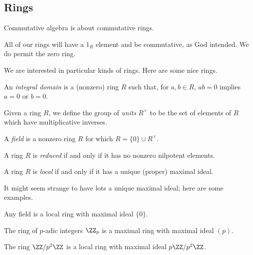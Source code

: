 \subsection{Rings}
Commutative algebra is about commutative rings.
\begin{warn}
	All of our rings will have a $1_R$ element and be commutative, as God intended. We do permit the zero ring.
\end{warn}
We are interested in particular kinds of rings. Here are some nice rings.
\begin{definition}
	An \textit{integral domain} is a (nonzero) ring $R$ such that, for $a,b\in R$, $ab=0$ implies $a=0$ or $b=0$.
\end{definition}
\begin{definition}[Units]
	Given a ring $R$, we define the group of \textit{units} $R^\times$ to be the set of elements of $R$ which have multiplicative inverses.
\end{definition}
\begin{definition}[Field]
	A \textit{field} is a nonzero ring $R$ for which $R=\{0\}\cup R^\times$.
\end{definition}
\begin{definition}[Reduced]
	A ring $R$ is \textit{reduced} if and only if it has no nonzero nilpotent elements.
\end{definition}
\begin{definition}[Local]
	A ring $R$ is \textit{local} if and only if it has a unique (proper) maximal ideal.
\end{definition}
It might seem strange to have lots a unique maximal ideal; here are some examples.
\begin{example}
	Any field is a local ring with maximal ideal $\{0\}$.
\end{example}
\begin{example}
	The ring of $p$-adic integers $\ZZ_p$ is a maximal ring with maximal ideal $(p)$.
\end{example}
\begin{example}
	The ring $\ZZ/p^2\ZZ$ is a local ring with maximal ideal $p\ZZ/p^2\ZZ$.
\end{example}

